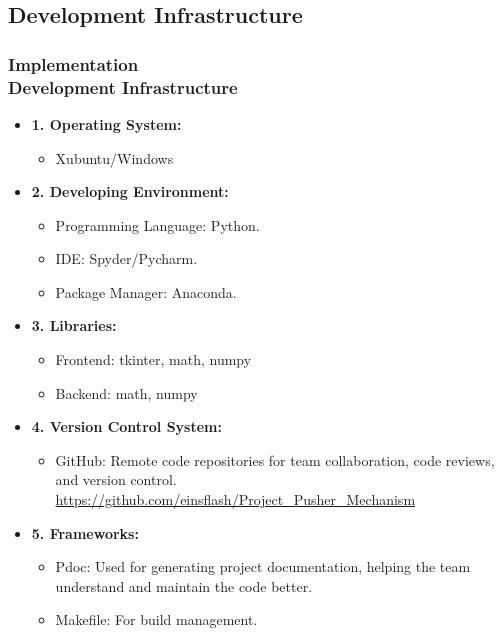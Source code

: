 \documentclass[ucs,10pt]{beamer}
\begin{document}
\subsection{Development Infrastructure}

\begin{frame}
\frametitle{Implementation \\
    \small \color{rwth-blue} Development Infrastructure}
    \begin{itemize}
        \item \textbf{1. Operating System:}
            \begin{itemize}
                \item Xubuntu/Windows
            \end{itemize}
        \item \textbf{2. Developing Environment:}
            \begin{itemize}
                \item Programming Language: Python.
                \item IDE: Spyder/Pycharm.
                \item Package Manager: Anaconda.
            \end{itemize}
        \item \textbf{3. Libraries:}
            \begin{itemize}
                \item Frontend: tkinter, math, numpy
                \item Backend: math, numpy
            \end{itemize}
        \item \textbf{4. Version Control System:}
            \begin{itemize}
                \item GitHub: Remote code repositories for team collaboration, code reviews, and version control. \url{https://github.com/einsflash/Project_Pusher_Mechanism}
            \end{itemize}
        \item \textbf{5. Frameworks:}
            \begin{itemize}
                \item Pdoc: Used for generating project documentation, helping the team understand and maintain the code better.
                \item Makefile: For build management.
            \end{itemize}
    \end{itemize}
\end{frame}
\end{document}
